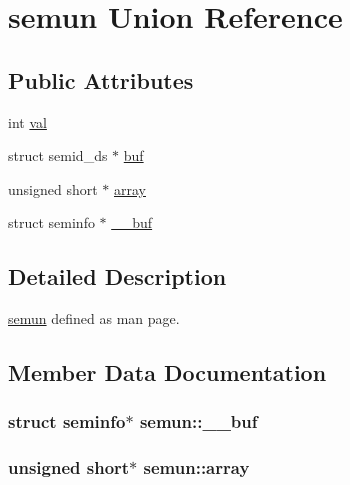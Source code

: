 \hypertarget{unionsemun}{
\section{semun Union Reference}
\label{unionsemun}
}
\subsection*{Public Attributes}
\begin{CompactItemize}
\item 
int \hyperlink{unionsemun_c6121ecb6d04a024e07e12bd71b94031}{val}
\item 
struct semid\_\-ds $\ast$ \hyperlink{unionsemun_c6b6428d07d4147fd2cc698b53555bed}{buf}
\item 
unsigned short $\ast$ \hyperlink{unionsemun_ca23b8e730a0553205813c0cb7692b54}{array}
\item 
struct seminfo $\ast$ \hyperlink{unionsemun_a0ac6a1a9174a4ae355bc367e7e64780}{\_\-\_\-buf}
\end{CompactItemize}


\subsection{Detailed Description}
\hyperlink{unionsemun}{semun} defined as man page. 

\subsection{Member Data Documentation}
\hypertarget{unionsemun_a0ac6a1a9174a4ae355bc367e7e64780}{
\subsubsection[{\_\-\_\-buf}]{\setlength{\rightskip}{0pt plus 5cm}struct seminfo$\ast$ {\bf semun::\_\-\_\-buf}}}
\label{unionsemun_a0ac6a1a9174a4ae355bc367e7e64780}


\hypertarget{unionsemun_ca23b8e730a0553205813c0cb7692b54}{
\subsubsection[{array}]{\setlength{\rightskip}{0pt plus 5cm}unsigned short$\ast$ {\bf semun::array}}}
\label{unionsemun_ca23b8e730a0553205813c0cb7692b54}


